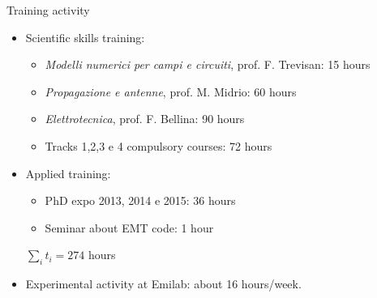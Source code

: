 \documentclass{beamer}
\begin{document}
\begin{frame}{Training activity}
    \begin{itemize}
    \item Scientific skills training:
        \begin{itemize}
            \item \emph{Modelli numerici per campi e circuiti}, prof. F. Trevisan: 15 hours
            \item \emph{Propagazione e antenne}, prof. M. Midrio: 60 hours
            \item \emph{Elettrotecnica}, prof. F. Bellina: 90 hours
            \item  Tracks 1,2,3 e 4 compulsory courses: 72 hours
        \end{itemize}
    \item Applied training:
        \begin{itemize}
            \item PhD expo 2013, 2014 e 2015: 36 hours
            \item Seminar about EMT code: 1 hour
        \end{itemize}
        \begin{center}
            $\sum_i t_i = 274$ hours
        \end{center}

    \item Experimental activity at Emilab: about 16 hours/week.
    \end{itemize}


\end{frame}
\end{document}
